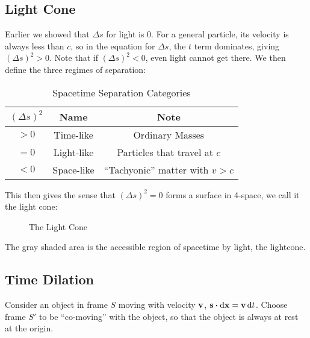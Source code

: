 \subsection{Light Cone}
Earlier we showed that $\Delta s$ for light is $0$. For a general particle, its velocity is always less than $c$, so in the equation for $\Delta s$, the $t$ term dominates, giving $(\Delta s)^2>0$. Note that if $(\Delta s)^2<0$, even light cannot get there. We then define the three regimes of separation:
\begin{table}[H]
  \centering
  \begin{tabular}{ccc}
    $(\Delta s)^2$ & Name & Note \\\hline
    $>0$ & Time-like & Ordinary Masses \\
    $=0$ & Light-like & Particles that travel at $c$ \\
    $<0$ & Space-like & ``Tachyonic'' matter with $v>c$
  \end{tabular}
  \caption{Spacetime Separation Categories}
\end{table}
This then gives the sense that $(\Delta s)^2=0$ forms a surface in 4-space, we call it the light cone:
\begin{figure}[H]
  \centering
  \caption{The Light Cone}
\end{figure}
The gray shaded area is the accessible region of spacetime by light, the lightcone.

\subsection{Time Dilation}
Consider an object in frame $S$ moving with velocity $\vb{v}$, $\vb{s}\vdot\dd{\vb{x}}=\vb{v}\dd{t}$. Choose frame $S'$ to be ``co-moving'' with the object, so that the object is always at rest at the origin.

